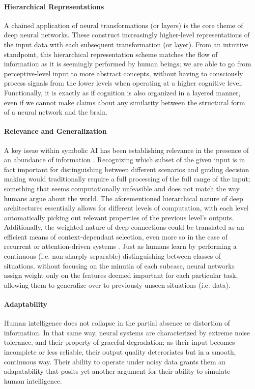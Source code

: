 \documentclass[]{article}
\begin{document}
\paragraph{Hierarchical Representations}
A chained application of neural transformations (or layers) is the core theme of deep neural networks. These construct increasingly higher-level representations of the input data with each subsequent transformation (or layer). From an intuitive standpoint, this hierarchical representation scheme matches the flow of information as it is seemingly performed by human beings; we are able to go from perceptive-level input to more abstract concepts, without having to consciously process signals from the lower levels when operating at a higher cognitive level. Functionally, it is exactly as if cognition is also organized in a layered manner, even if we cannot make claims about any similarity between the structural form of a neural network and the brain.

\paragraph{Relevance and Generalization}
A key issue within symbolic AI has been establishing relevance in the presence of an abundance of information \cite{Dreyfus1972-DREWCC}. Recognizing which subset of the given input is in fact important for distinguishing between different scenarios and guiding decision making would traditionally require a full processing of the full range of the input; something that seems computationally unfeasible and does not match the way humans argue about the world. The aforementioned hierarchical nature of deep architectures essentially allows for different levels of computation, with each level automatically picking out relevant properties of the previous level's outputs. Additionally, the weighted nature of deep connections could be translated as an efficient means of context-dependant selection, even more so in the case of recurrent or attention-driven systems \cite{DBLP:journals/corr/MnihHGK14}. Just as humans learn by performing a continuous (i.e. non-sharply separable) distinguishing between classes of situations, without focusing on the minutia of each subcase, neural networks assign weight only on the features deemed important for each particular task, allowing them to generalize over to previously unseen situations (i.e. data).

\paragraph{Adaptability}
Human intelligence does not collapse in the partial absence or distortion of information. In that same way, neural systems are characterized by extreme noise tolerance, and their property of graceful degradation; as their input becomes incomplete or less reliable, their output quality deteroriates but in a smooth, continuous way. Their ability to operate under noisy data grants them an adapatability that posits yet another argument for their ability to simulate human intelligence. 
\end{document}
